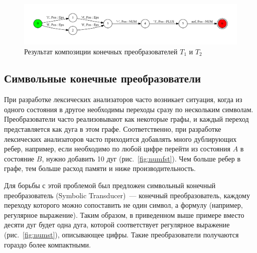\begin{figure}[h!]
        \includegraphics[width=\linewidth]{Gumin/pictures/res_.pdf}
        \caption{Результат композиции конечных преобразователей $T_1$ и $T_2$}
        \label{compose3} 
\end{figure}

\subsection{Символьные конечные преобразователи}
При разработке лексических анализаторов часто возникает ситуация, когда из одного состояния в другое необходимы переходы сразу по нескольким символам. Преобразователи часто реализовывают как некоторые графы, и каждый переход представляется как дуга в этом графе. Соответственно, при разработке лексических анализаторов часто приходится добавлять много дублирующих ребер, например, если необходимо по любой цифре перейти из состояния $A$ в состояние $B$, нужно добавить 10 дуг (рис.~\ref{fig:numfst}). Чем больше ребер в графе, тем больше расход памяти и ниже производительность.

Для борьбы с этой проблемой был предложен символьный конечный преобразователь (Symbolic Transducer)~--- конечный преобразователь,  каждому переходу которого можно сопоставить не один символ, а формулу (например, регулярное выражение). Таким образом, в приведенном выше примере вместо десяти дуг будет одна дуга, которой соответствует регулярное выражение (рис.~\ref{fig:numst}), описывающее цифры. Такие преобразователи получаются гораздо более компактными. 

